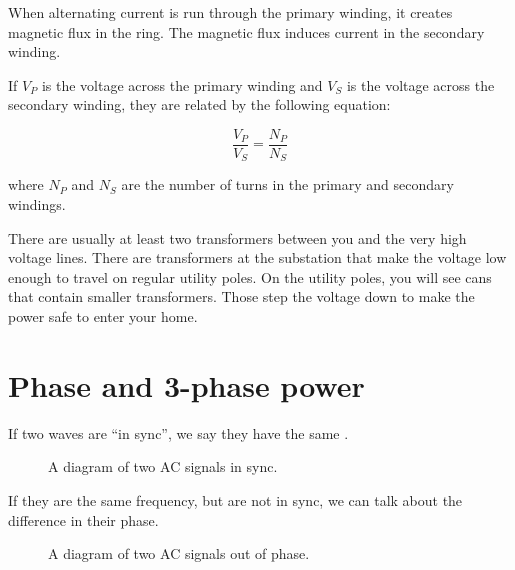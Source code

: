 When alternating current is run through the primary winding, it creates magnetic
flux in the ring. The magnetic flux induces current in the secondary
winding.

If $V_P$ is the voltage across the primary winding and $V_S$ is the
voltage across the secondary winding, they are related by the
following equation:

$$\frac{V_P}{V_S} = \frac{N_P}{N_S}$$

where $N_P$ and $N_S$ are the number of turns in the primary and
secondary windings.

There are usually at least two transformers between you and the very
high voltage lines. There are transformers at the substation that make
the voltage low enough to travel on regular utility poles. On the
utility poles, you will see cans that contain smaller
transformers. Those step the voltage down to make the power safe to
enter your home.

\section{Phase and 3-phase power}

If two waves are ``in sync'', we say they have the same .
\begin{figure}[htbp]
    \centering
    \caption{A diagram of two AC signals in sync.}
    \label{fig:ACsync}
\end{figure}

If they are the same frequency, but are not in sync, we can talk about
the difference in their phase.
\begin{figure}[htbp]
    \centering
    \caption{A diagram of two AC signals out of phase.}
    \label{fig:ACoutsync}
\end{figure}

